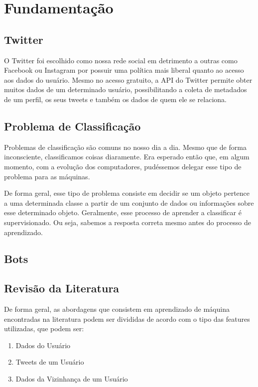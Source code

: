 \chapter{Fundamentação}\label{chp:FUNDAMENTACAO}
\section{Twitter}
O Twitter foi escolhido como nossa rede social em detrimento a outras como Facebook ou Instagram por possuir uma política mais liberal quanto ao acesso aos dados do usuário. Mesmo no acesso gratuito, a API do Twitter permite obter muitos dados de um determinado usuário, possibilitando a coleta de metadados de um perfil, os seus tweets e também os dados de quem ele se relaciona.  

\section{Problema de Classificação}
Problemas de classificação são comuns no nosso dia a dia. Mesmo que de forma inconsciente, classificamos coisas diaramente. Era esperado então que, em algum momento, com a evolução dos computadores, pudéssemos delegar esse tipo de problema para as máquinas.

De forma geral, esse tipo de problema consiste em decidir se um objeto pertence a uma determinada classe a partir de um conjunto de dados ou informações sobre esse determinado objeto. Geralmente, esse processo de aprender a classificar é supervisionado. Ou seja, sabemos a resposta correta mesmo antes do processo de aprendizado. 

\section{Bots}

\section{Revisão da Literatura}

De forma geral, as abordagens que consistem em aprendizado de máquina encontradas na literatura podem ser divididas de acordo com o tipo das features utilizadas, que podem ser: 
\begin{enumerate}
    \item Dados do Usuário
    \item Tweets de um Usuário
    \item Dados da Vizinhança de um Usuário
\end{enumerate}

